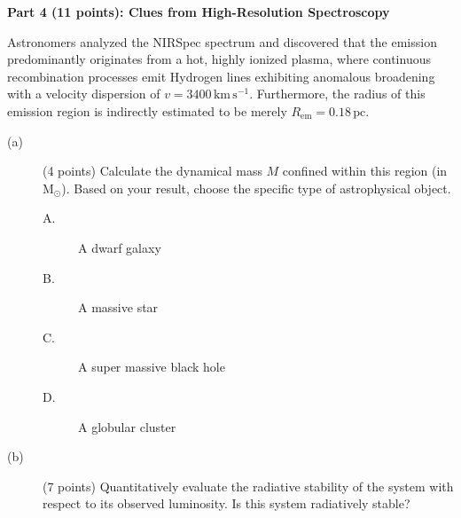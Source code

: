 \medskip\noindent\textbf{Part 4 (11 points): Clues from High-Resolution Spectroscopy}

Astronomers analyzed the NIRSpec spectrum and discovered that the emission
predominantly originates from a hot, highly ionized plasma, where continuous
recombination processes emit Hydrogen lines exhibiting anomalous broadening
with a velocity dispersion of $v = 3400\,\mathrm{km\,s^{-1}}$. Furthermore,
the radius of this emission region is indirectly estimated to be merely
$R_{\mathrm{em}} = 0.18\,\mathrm{pc}$.

\begin{description}
\item[(a)] (4 points) Calculate the dynamical mass $M$ confined within this
  region (in $\mathrm{M}_\odot$). Based on your result, choose the specific
  type of astrophysical object.
  \begin{description}
  \item[A.] A dwarf galaxy
  \item[B.] A massive star
  \item[C.] A super massive black hole
  \item[D.] A globular cluster
  \end{description}
\item[(b)] (7 points) Quantitatively evaluate the radiative stability of the
  system with respect to its observed luminosity. Is this system radiatively
  stable?
\end{description}
